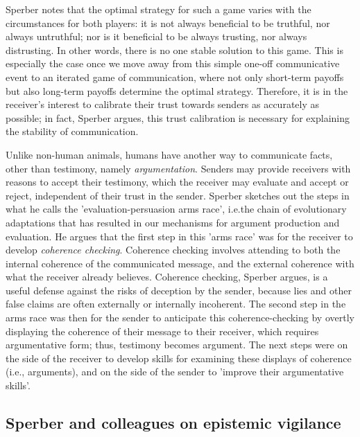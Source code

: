 Sperber notes that the optimal strategy for such a game varies with the circumstances for both players: it is not always beneficial to be truthful, nor always untruthful; nor is it beneficial to be always trusting, nor always distrusting. In other words, there is no one stable solution to this game.
This is especially the case once we move away from this simple one-off communicative event to an iterated game of communication, where not only short-term payoffs but also long-term payoffs determine the optimal strategy.
Therefore, it is in the receiver's interest to calibrate their trust towards senders as accurately as possible; in fact, Sperber argues, this trust calibration is necessary for explaining the stability of communication.

Unlike non-human animals, humans have another way to communicate facts, other than testimony, namely \emph{argumentation}. Senders may provide receivers with reasons to accept their testimony, which the receiver may evaluate and accept or reject, independent of their trust in the sender.
Sperber sketches out the steps in what he calls the 'evaluation-persuasion arms race', i.e.\@ the chain of evolutionary adaptations that has resulted in our mechanisms for argument production and evaluation.
He argues that the first step in this 'arms race' was for the receiver to develop \emph{coherence checking}. Coherence checking involves attending to both the internal coherence of the communicated message, and the external coherence with what the receiver already believes. Coherence checking, Sperber argues, is a useful defense against the risks of deception by the sender, because lies and other false claims are often externally or internally incoherent.
The second step in the arms race was then for the sender to anticipate this coherence-checking by overtly displaying the coherence of their message to their receiver, which requires argumentative form; thus, testimony becomes argument. The next steps were on the side of the receiver to develop skills for examining these displays of coherence (i.e., arguments), and on the side of the sender to 'improve their argumentative skills'.

\subsection{Sperber and colleagues on epistemic vigilance}
\label{sec:Sperber10}


